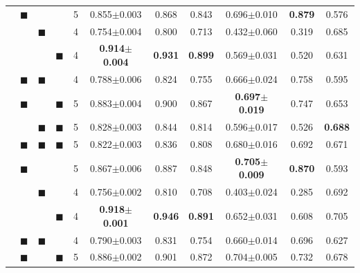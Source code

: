 \documentclass[11pt]{article}
\newcommand{\bs}[0]{$\blacksquare$}
\newcommand{\umbert}{\mbox{UmBERTo}}
\newcommand{\iumbert}{\mbox{Incel UmBERTo}}
\begin{document}
\begin{table}[t]
\begin{tabular}{l|c@{\hspace{1mm}}c@{\hspace{1mm}}c@{\hspace{1mm}}|c@{\hspace{1mm}}|ccc|ccc}
        \multirow{7}{*}[0pt]{\rotatebox[origin=c]{90}{\begin{minipage}{1.7cm}\umbert\end{minipage}}} 
        &  \bs  &      &      &      5 &      0.855$\pm$0.003 &     0.868 &       0.843 &       0.696$\pm$0.010 & \bf  0.879 &       0.576 \\ %
        &       &  \bs &      &      4 &      0.754$\pm$0.004 &     0.800 &       0.713 &       0.432$\pm$0.060 &      0.319 &       0.685 \\ %
        &       &      &  \bs &      4 & \bf  0.914$\pm$0.004 & \bf 0.931 &  \bf  0.899 &       0.569$\pm$0.031 &      0.520 &       0.631 \\ %
        &  \bs  &  \bs &      &      4 &      0.788$\pm$0.006 &     0.824 &       0.755 &       0.666$\pm$0.024 &      0.758 &       0.595 \\ %
        &  \bs  &      &  \bs &      5 &      0.883$\pm$0.004 &     0.900 &       0.867 &  \bf  0.697$\pm$0.019 &      0.747 &       0.653 \\ %
        &       &  \bs &  \bs &      5 &      0.828$\pm$0.003 &     0.844 &       0.814 &       0.596$\pm$0.017 &      0.526 &  \bf  0.688 \\ %
        &  \bs  &  \bs &  \bs &      5 &      0.822$\pm$0.003 &     0.836 &       0.808 &       0.680$\pm$0.016 &      0.692 &       0.671 \\ %
        \hline
        \multirow{7}{*}[0pt]{\rotatebox[origin=c]{90}{\begin{minipage}{2.6cm} \iumbert\end{minipage}}} 
        &  \bs  &      &      &      5 &      0.867$\pm$0.006 &     0.887 &       0.848 &  \bf  0.705$\pm$0.009 & \bf  0.870 &       0.593 \\ %
        &       &  \bs &      &      4 &      0.756$\pm$0.002 &     0.810 &       0.708 &       0.403$\pm$0.024 &      0.285 &       0.692 \\ %
        &       &      &  \bs &      4 & \bf  0.918$\pm$0.001 & \bf 0.946 &  \bf  0.891 &       0.652$\pm$0.031 &      0.608 &       0.705 \\ %
        &  \bs  &  \bs &      &      4 &      0.790$\pm$0.003 &     0.831 &       0.754 &       0.660$\pm$0.014 &      0.696 &       0.627 \\ %
        &  \bs  &      &  \bs &      5 &      0.886$\pm$0.002 &     0.901 &       0.872 &       0.704$\pm$0.005 &      0.732 &       0.678 \\ %

\end{tabular}
\end{table}
\end{document}
